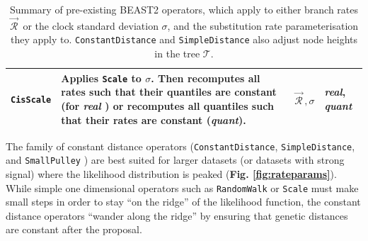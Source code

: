 \documentclass[10pt,letterpaper]{article}
\begin{document}
\begin{table}[h!]
\begin{tabular}{l p{4.2cm} l l}
 \hline
\texttt{CisScale} & Applies \texttt{Scale} to $\sigma$. Then recomputes all rates such that their quantiles are constant (for \textit{real} \cite{zhang2020improving}) or recomputes all quantiles such that their rates are constant (\textit{quant}).  & $\vec{\mathcal{R}}^{\,}, \sigma$ & \textit{real}, \textit{quant} \\
 \hline
\end{tabular}
\caption{Summary of pre-existing BEAST2 operators, which apply to either branch rates $\vec{\mathcal{R}}^{\,}$ or the clock standard deviation $\sigma$, and the substitution rate parameterisation they apply to.
 \texttt{ConstantDistance} and \texttt{SimpleDistance} also adjust node heights in the tree $\mathcal{T}$. }
\label{table:kernels}
\end{table}





The family of constant distance operators (\texttt{ConstantDistance}, \texttt{SimpleDistance}, and \texttt{SmallPulley} \cite{zhang2020improving}) are best suited for larger datasets (or datasets with strong signal) where the likelihood distribution is peaked (\textbf{Fig. \ref{fig:rateparams}}).
While simple one dimensional operators such as \texttt{RandomWalk} or \texttt{Scale} must make small steps in order to stay ``on the ridge'' of the likelihood function, the constant distance operators ``wander along the ridge''  by ensuring that genetic distances are constant after the proposal.
\end{document}
